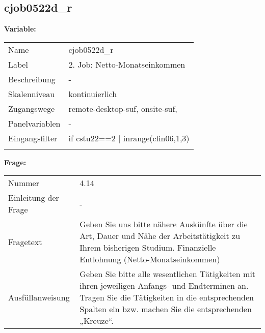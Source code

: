	
	
	\subsection{cjob0522d\_r}
	\label{subSection:cjob0522d_r}

	\noindent\textbf{Variable:}\\
		\begin{tabular}{lL{11.3cm}}
			\label{tableVariable:cjob0522d_r}
			Name & cjob0522d\_r \\
			Label & 2. Job: Netto-Monatseinkommen \\
			Beschreibung & - \\
			Skalenniveau & kontinuierlich \\
			Zugangswege &
				remote-desktop-suf,
				onsite-suf,
 \\
			Panelvariablen & -
			 \\
			Eingangsfilter & if cstu22==2 | inrange(cfin06,1,3) \\
 \\
		\end{tabular}

		\vspace*{1 cm}
		\noindent\textbf{Frage:}\\
		\begin{tabular}{lL{11.3cm}}
			\label{tableQuestion:cjob0522d_r}
			Nummer & 4.14 \\
			Einleitung der Frage & - \\
			Fragetext & Geben Sie uns bitte nähere Auskünfte über die Art, Dauer und Nähe der Arbeitstätigkeit zu Ihrem bisherigen Studium.
Finanzielle Entlohnung
(Netto-Monatseinkommen) \\
			Ausfüllanweisung & Geben Sie bitte alle wesentlichen Tätigkeiten mit ihren jeweiligen Anfangs- und Endterminen an. Tragen Sie die Tätigkeiten in die entsprechenden Spalten ein bzw. machen Sie die entsprechenden „Kreuze“. \\
		\end{tabular}




